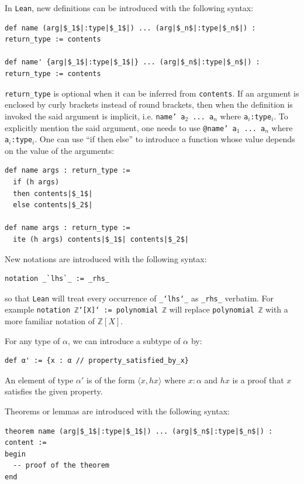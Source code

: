 \documentclass{report}
\theoremstyle{definition}
\begin{document}
In {\tt \small Lean}, new definitions can be introduced with the following syntax:
\begin{verbatim}
def name (arg|$_1$|:type|$_1$|) ... (arg|$_n$|:type|$_n$|) : return_type := contents

def name' {arg|$_1$|:type|$_1$|} ... (arg|$_n$|:type|$_n$|) : return_type := contents
\end{verbatim}
{\tt \small return\_type} is optional when it can be inferred from {\tt \small contents}. If an argument is enclosed by curly brackets instead of round brackets, then when the definition is invoked the said argument is implicit, i.e. {\tt \small name' a$_2$ ... a$_n$} where {\tt \small a$_i$:type$_i$}. To explicitly mention the said argument, one needs to use {\tt \small @name' a$_1$ ... a$_n$} where {\tt \small a$_i$:type$_i$}. One can use ``if then else'' to introduce a function whose value depends on the value of the arguments:
\begin{verbatim}
def name args : return_type :=
  if (h args)
  then contents|$_1$|
  else contents|$_2$|

def name args : return_type := 
  ite (h args) contents|$_1$| contents|$_2$|
\end{verbatim}

New notations are introduced with the following syntax:
\begin{verbatim}
notation _`lhs`_ := _rhs_
\end{verbatim}
so that {\tt \small Lean} will treat every occurrence of {\tt \small \_`lhs`\_} as {\tt \small \_rhs\_} verbatim. For example \texttt{notation ℤ`[X]` := polynomial ℤ} will replace {\tt \small polynomial ℤ} with a more familiar notation of $\mathbb{Z}[X]$.

For any type of $\alpha$, we can introduce a subtype of $\alpha$ by:
\begin{verbatim}
def α' := {x : α // property_satisfied_by_x}
\end{verbatim}
An element of type $\alpha'$ is of the form $\langle x, hx\rangle$ where $x:\alpha$ and $hx$ is a proof that $x$ satisfies the given property.

Theorems or lemmas are introduced with the following syntax:
\begin{verbatim}
theorem name (arg|$_1$|:type|$_1$|) ... (arg|$_n$|:type|$_n$|) : content :=
begin
  -- proof of the theorem
end
\end{verbatim}
\end{document}
